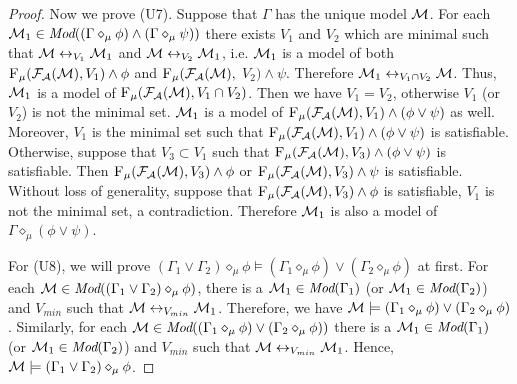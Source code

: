\documentclass[runningheads]{llncs}
\begin{document}
\begin{proof}
 Now we prove (U7). Suppose that $\Gamma$ has the unique model ${\cal M}$. For each ${\cal M}_1 \in \textit{Mod}((\Gamma \diamond_{\mu} \phi) \wedge (\Gamma \diamond_{\mu} \psi))$ there exists $V_1$ and $V_2$ which are minimal such that ${\cal M} \leftrightarrow_{V_1} {\cal M}_1$ and ${\cal M} \leftrightarrow_{V_2} {\cal M}_1$, i.e. ${\cal M}_1$ is a model of both ${\textsc{F}_{\textsc{$\mu$}}}({\cal F}_{{\cal A}}({\cal M}), V_1) \wedge \phi$ and ${\textsc{F}_{\textsc{$\mu$}}}({\cal F}_{{\cal A}}({\cal M}),$ $V_2) \wedge \psi$. Therefore ${\cal M}_1 \leftrightarrow_{V_1 \cap V_2} {\cal M}$. Thus, ${\cal M}_1$ is a model of ${\textsc{F}_{\textsc{$\mu$}}}({\cal F}_{{\cal A}}({\cal M}), V_1 \cap V_2)$. Then we have $V_1 = V_2$, otherwise $V_1$ (or $V_2$) is not the minimal set. ${\cal M}_1$ is a model of ${\textsc{F}_{\textsc{$\mu$}}}({\cal F}_{{\cal A}}({\cal M}), V_1) \wedge (\phi \vee \psi)$ as well. Moreover, $V_1$ is the minimal set such that ${\textsc{F}_{\textsc{$\mu$}}}({\cal F}_{{\cal A}}({\cal M}), V_1) \wedge (\phi \vee \psi)$ is satisfiable. Otherwise, suppose that $V_3\subset V_1$ such that ${\textsc{F}_{\textsc{$\mu$}}}({\cal F}_{{\cal A}}({\cal M}), V_3) \wedge (\phi \vee \psi)$ is satisfiable. Then ${\textsc{F}_{\textsc{$\mu$}}}({\cal F}_{{\cal A}}({\cal M}), V_3) \wedge \phi$ or ${\textsc{F}_{\textsc{$\mu$}}}({\cal F}_{{\cal A}}({\cal M}), V_3) \wedge \psi$ is satisfiable. Without loss of generality, suppose that ${\textsc{F}_{\textsc{$\mu$}}}({\cal F}_{{\cal A}}({\cal M}), V_3) \wedge \phi$ is satisfiable, $V_1$ is not the minimal set, a contradiction. Therefore ${\cal M}_1$ is also a model of $\Gamma \diamond_{\mu} (\phi \vee \psi)$.

 For (U8), we will prove $(\Gamma_1 \vee \Gamma_2) \diamond_{\mu} \phi \models (\Gamma_1 \diamond_{\mu} \phi) \vee (\Gamma_2 \diamond_{\mu} \phi)$ at first. For each ${\cal M} \in \textit{Mod}((\Gamma_1 \vee \Gamma_2) \diamond_{\mu} \phi)$, there is a ${\cal M}_1 \in \textit{Mod}(\Gamma_1)$ (or ${\cal M}_1\in \textit{Mod}(\Gamma_2)$) and $V_{min}$ such that ${\cal M} \leftrightarrow_{V_{min}} {\cal M}_1$. Therefore, we have ${\cal M} \models  (\Gamma_1 \diamond_{\mu} \phi) \vee (\Gamma_2 \diamond_{\mu} \phi)$. Similarly, for each ${\cal M} \in \textit{Mod}( (\Gamma_1 \diamond_{\mu} \phi) \vee (\Gamma_2 \diamond_{\mu} \phi))$ there is a ${\cal M}_1\in \textit{Mod}(\Gamma_1)$ (or ${\cal M}_1 \in \textit{Mod}(\Gamma_2)$) and $V_{min}$ such that ${\cal M} \leftrightarrow_{V_{min}} {\cal M}_1$. Hence, ${\cal M} \models (\Gamma_1 \vee \Gamma_2) \diamond_{\mu} \phi$.
 \end{proof}
\end{document}
